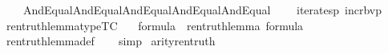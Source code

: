 \begin{isabellebody}
\ \ \ \ And{\isacharparenleft}{\kern0pt}Equal{\isacharparenleft}{\kern0pt}{}{\isacharcomma}{\kern0pt}{}{\isacharparenright}{\kern0pt}{\isacharcomma}{\kern0pt}And{\isacharparenleft}{\kern0pt}Equal{\isacharparenleft}{\kern0pt}{}{\isacharcomma}{\kern0pt}{}{\isacharparenright}{\kern0pt}{\isacharcomma}{\kern0pt}And{\isacharparenleft}{\kern0pt}Equal{\isacharparenleft}{\kern0pt}{}{\isacharcomma}{\kern0pt}{}{\isacharparenright}{\kern0pt}{\isacharcomma}{\kern0pt}And{\isacharparenleft}{\kern0pt}Equal{\isacharparenleft}{\kern0pt}{}{\isacharcomma}{\kern0pt}{}{}{\isacharparenright}{\kern0pt}{\isacharcomma}{\kern0pt}And{\isacharparenleft}{\kern0pt}Equal{\isacharparenleft}{\kern0pt}{}{\isacharcomma}{\kern0pt}{}{\isacharparenright}{\kern0pt}{\isacharcomma}{\kern0pt}\isanewline
\ \ \ \ iterates{\isacharparenleft}{\kern0pt}{\isasymlambda}p{\isachardot}{\kern0pt}\ incr{\isacharunderscore}{\kern0pt}bv{\isacharparenleft}{\kern0pt}p{\isacharparenright}{\kern0pt}{\isacharbackquote}{\kern0pt}{}\ {\isacharcomma}{\kern0pt}\ {}{\isacharcomma}{\kern0pt}\ {\isasymphi}{\isacharparenright}{\kern0pt}{\isacharparenright}{\kern0pt}{\isacharparenright}{\kern0pt}{\isacharparenright}{\kern0pt}{\isacharparenright}{\kern0pt}{\isacharparenright}{\kern0pt}{\isacharparenright}{\kern0pt}{\isacharparenright}{\kern0pt}{\isacharparenright}{\kern0pt}{\isacharparenright}{\kern0pt}{\isacharparenright}{\kern0pt}{\isachardoublequoteclose}\isanewline
\isanewline
{}\isamarkupfalse%
\ ren{\isacharunderscore}{\kern0pt}truth{\isacharunderscore}{\kern0pt}lemma{\isacharunderscore}{\kern0pt}type{\isacharbrackleft}{\kern0pt}TC{\isacharbrackright}{\kern0pt}\ {\isacharcolon}{\kern0pt}\isanewline
\ \ {\isachardoublequoteopen}{\isasymphi}{\isasymin}formula\ {\isasymLongrightarrow}\ ren{\isacharunderscore}{\kern0pt}truth{\isacharunderscore}{\kern0pt}lemma{\isacharparenleft}{\kern0pt}{\isasymphi}{\isacharparenright}{\kern0pt}\ {\isasymin}formula{\isachardoublequoteclose}\ \isanewline
%
\isadelimproof
\ \ %
\endisadelimproof
%
\isatagproof
{}\isamarkupfalse%
\ ren{\isacharunderscore}{\kern0pt}truth{\isacharunderscore}{\kern0pt}lemma{\isacharunderscore}{\kern0pt}def\isanewline
\ \ \isamarkupfalse%
\ simp%
\endisatagproof
{\isafoldproof}%
%
\isadelimproof
\isanewline
%
\endisadelimproof
\isanewline
{}\isamarkupfalse%
\ arity{\isacharunderscore}{\kern0pt}ren{\isacharunderscore}{\kern0pt}truth\ {\isacharcolon}{\kern0pt}\ \isanewline

\end{isabellebody}
